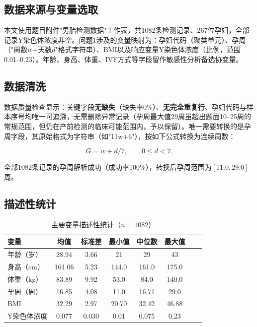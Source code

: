\documentclass[12pt,a4paper]{ctexart}
\begin{document}
\subsection{数据来源与变量选取}

本文使用题目附件"男胎检测数据"工作表，共1082条检测记录、267位孕妇，全部记录Y染色体浓度非空。问题1涉及的变量映射为：孕妇代码（聚类单元）、孕周（"周数$w$+天数$d$"格式字符串）、BMI以及响应变量Y染色体浓度（比例，范围0.01--0.23）。年龄、身高、体重、IVF方式等字段留作敏感性分析备选协变量。

\subsection{数据清洗}

数据质量检查显示：关键字段\textbf{无缺失}（缺失率0\%）、\textbf{无完全重复行}、孕妇代码与样本序号均唯一可追溯，无需删除异常记录（孕周最大值29周虽超出题面10--25周的常规范围，但仍在产前检测的临床可能范围内，予以保留）。唯一需要转换的是孕周字段，其原始格式为字符串（如"11w+6"），按如下公式转换为连续周数：

\begin{equation}
G = w + d/7, \qquad 0\le d < 7 .
\end{equation}

全部1082条记录的孕周解析成功（成功率100\%），转换后孕周范围为$[11.0, 29.0]$周。

\subsection{描述性统计}

\begin{table}[htbp]
\centering
\caption{主要变量描述性统计（$n=1082$）}
\label{tab:desc}
\begin{tabular}{lccccccc}
\toprule
变量 & 均值 & 标准差 & 最小值 & 中位数 & 最大值 \\
\midrule
年龄（岁） & 28.94 & 3.66 & 21 & 29 & 43 \\
身高（cm） & 161.06 & 5.23 & 144.0 & 161.0 & 175.0 \\
体重（kg） & 83.89 & 9.92 & 53.0 & 84.0 & 140.0 \\
孕周（周） & 16.85 & 4.08 & 11.0 & 16.71 & 29.0 \\
BMI & 32.29 & 2.97 & 20.70 & 32.42 & 46.88 \\
Y染色体浓度 & 0.077 & 0.030 & 0.01 & 0.075 & 0.23 \\
\bottomrule
\end{tabular}
\end{table}
\end{document}
